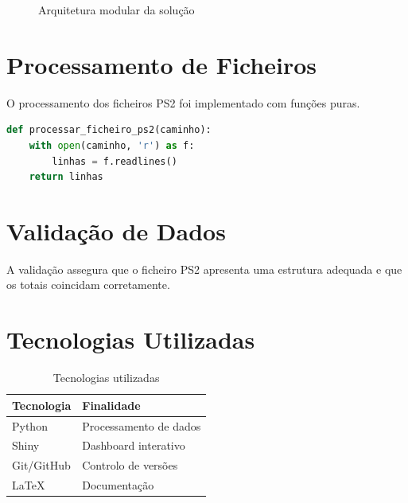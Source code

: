 \documentclass[11pt,a4paper]{report}
\begin{document}
\begin{figure}[H]
\centering
{}
\caption{Arquitetura modular da solução}
\end{figure}

\section{Processamento de Ficheiros}
O processamento dos ficheiros PS2 foi implementado com funções puras.

\begin{lstlisting}[language=Python, caption={Processamento de ficheiro PS2}]
def processar_ficheiro_ps2(caminho):
    with open(caminho, 'r') as f:
        linhas = f.readlines()
    return linhas
\end{lstlisting}

\section{Validação de Dados}
A validação assegura que o ficheiro PS2 apresenta uma estrutura adequada e que os totais coincidam corretamente.

\section{Tecnologias Utilizadas}
\begin{table}[H]
\centering
\caption{Tecnologias utilizadas}
\begin{tabular}{|l|l|}
\hline
\textbf{Tecnologia} & \textbf{Finalidade} \\ \hline
Python & Processamento de dados \\ \hline
Shiny & Dashboard interativo \\ \hline
Git/GitHub & Controlo de versões \\ \hline
LaTeX & Documentação \\ \hline
\end{tabular}
\end{table}
\end{document}
